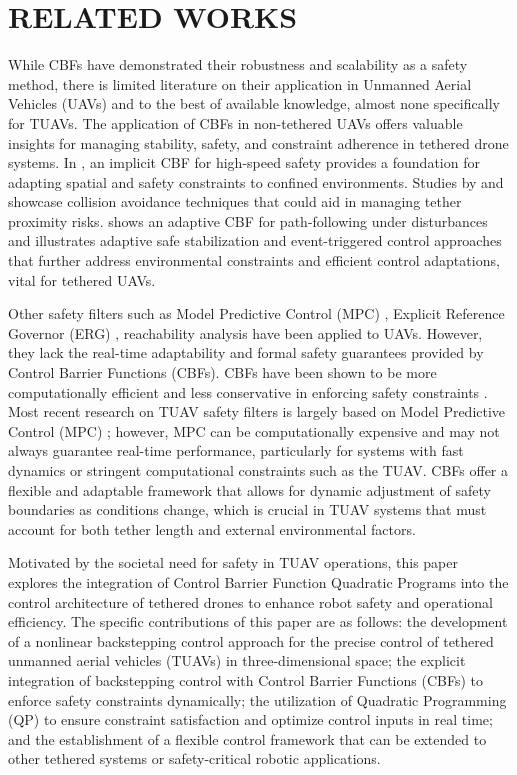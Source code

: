 \section{RELATED WORKS}
While CBFs have demonstrated their robustness and scalability \cite{Li_2021, Lopez_2021, Lindemann_2024} as a safety method, there is limited literature on their application in Unmanned Aerial Vehicles (UAVs) and to the best of available knowledge, almost none specifically for TUAVs. The application of CBFs in non-tethered UAVs offers valuable insights for managing stability, safety, and constraint adherence in tethered drone systems. In \cite{Singletary_2022}, an implicit CBF for high-speed safety provides a foundation for adapting spatial and safety constraints to confined environments. Studies by \cite{Panja_2023} and \cite{Tayal_2024} showcase collision avoidance techniques that could aid in managing tether proximity risks. \cite{Zheng_2023} shows an adaptive CBF for path-following under disturbances and \cite{Wang_2018, Wang_2023, Liu_2024} illustrates adaptive safe stabilization and event-triggered control approaches that further address environmental constraints and efficient control adaptations, vital for tethered UAVs. 

Other safety filters such as Model Predictive Control (MPC) \cite{Korsarnovsky_2020, Singh_2001, Lindqvist_2020}, Explicit Reference Governor (ERG) \cite{Hermand_2018}, reachability analysis \cite{Ankit_2024, Zhou_2015, Ding_2012} have been applied to UAVs. However, they lack the real-time adaptability and formal safety guarantees provided by Control Barrier Functions (CBFs). CBFs have been shown to be more computationally efficient \cite{Li_2021} and less conservative in enforcing safety constraints \cite{Tayal_2024}. Most recent research on TUAV safety filters is largely based on Model Predictive Control (MPC) \cite{Bolognini_2022, Valerio_2022}; however, MPC can be computationally expensive and may not always guarantee real-time performance, particularly for systems with fast dynamics or stringent computational constraints such as the TUAV. CBFs offer a flexible and adaptable framework that allows for dynamic adjustment of safety boundaries as conditions change, which is crucial in TUAV systems that must account for both tether length and external environmental factors. 

Motivated by the societal need for safety in TUAV operations, this paper explores the integration of Control Barrier Function Quadratic Programs into the control architecture of tethered drones to enhance robot safety and operational efficiency. The specific contributions of this paper are as follows: the development of a nonlinear backstepping control approach for the precise control of tethered unmanned aerial vehicles (TUAVs) in three-dimensional space; the explicit integration of backstepping control with Control Barrier Functions (CBFs) to enforce safety constraints dynamically; the utilization of Quadratic Programming (QP) to ensure constraint satisfaction and optimize control inputs in real time; and the establishment of a flexible control framework that can be extended to other tethered systems or safety-critical robotic applications.
